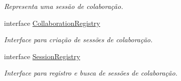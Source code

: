 \begin{DoxyCompactItemize}
\begin{DoxyCompactList}\small\item\em \-Representa uma sessão de colaboração. \end{DoxyCompactList}\item 
interface \hyperlink{interfacetecgraf_1_1openbus_1_1services_1_1collaboration_1_1v1__0_1_1CollaborationRegistry}{\-Collaboration\-Registry}
\begin{DoxyCompactList}\small\item\em \-Interface para criação de sessões de colaboração. \end{DoxyCompactList}\item 
interface \hyperlink{interfacetecgraf_1_1openbus_1_1services_1_1collaboration_1_1v1__0_1_1SessionRegistry}{\-Session\-Registry}
\begin{DoxyCompactList}\small\item\em \-Interface para registro e busca de sessões de colaboração. \end{DoxyCompactList}\end{DoxyCompactItemize}
